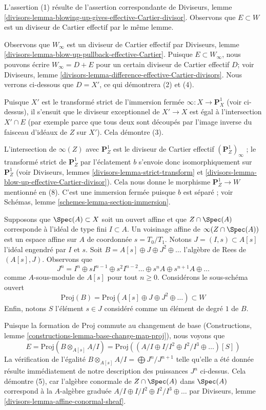 \medskip\noindent
L'assertion (1) résulte de l'assertion correspondante de Diviseurs, lemme
\ref{divisors-lemma-blowing-up-gives-effective-Cartier-divisor}.
Observons que $E \subset W$ est un diviseur de Cartier effectif par le même lemme.

\medskip\noindent
Observons que $W_\infty$ est un diviseur de Cartier effectif par
Diviseurs, lemme \ref{divisors-lemma-blow-up-pullback-effective-Cartier}.
Puisque $E \subset W_\infty$, nous pouvons écrire $W_\infty = D + E$ pour un certain
diviseur de Cartier effectif $D$; voir
Diviseurs, lemme \ref{divisors-lemma-difference-effective-Cartier-divisors}.
Nous verrons ci-dessous que $D = X'$, ce qui démontrera (2) et (4).

\medskip\noindent
Puisque $X'$ est le transformé strict de l'immersion fermée
$\infty : X \to \mathbf{P}^1_X$ (voir ci-dessus), il s'ensuit que le diviseur
exceptionnel de $X' \to X$ est égal à l'intersection $X' \cap E$
(par exemple parce que tous deux sont découpés par l'image inverse du
faisceau d'idéaux de $Z$ sur $X'$). Cela démontre (3).

\medskip\noindent
L'intersection de $\infty(Z)$ avec $\mathbf{P}^1_Z$ est le diviseur de Cartier
effectif $(\mathbf{P}^1_Z)_\infty$ ; le transformé strict
de $\mathbf{P}^1_Z$ par l'éclatement $b$ s'envoie donc isomorphiquement sur
$\mathbf{P}^1_Z$ (voir Diviseurs, lemmes \ref{divisors-lemma-strict-transform}
et \ref{divisors-lemma-blow-up-effective-Cartier-divisor}).
Cela nous donne le morphisme $\mathbf{P}^1_Z \to W$ mentionné en (8).
C'est une immersion fermée puisque $b$ est séparé ; voir
Schémas, lemme \ref{schemes-lemma-section-immersion}.

\medskip\noindent
Supposons que $\Spec(A) \subset X$ soit un ouvert affine et que $Z \cap \Spec(A)$
corresponde à l'idéal de type fini $I \subset A$.
Un voisinage affine de $\infty(Z \cap \Spec(A))$ est un
espace affine sur $A$ de coordonnée $s = T_0/T_1$. Notons
$J = (I, s) \subset A[s]$ l'idéal engendré par $I$ et $s$.
Soit $B = A[s] \oplus J \oplus J^2 \oplus \ldots$ l'algèbre de Rees
de $(A[s], J)$. Observons que
$$
J^n =
I^n \oplus sI^{n - 1} \oplus s^2I^{n - 2} \ldots \oplus s^nA
\oplus s^{n + 1}A \oplus \ldots
$$
comme $A$-sous-module de $A[s]$ pour tout $n \geq 0$. Considérons le sous-schéma ouvert
$$
\text{Proj}(B) = \text{Proj}(A[s] \oplus J \oplus J^2 \oplus \ldots)
\subset W
$$
Enfin, notons $S$ l'élément $s \in J$ considéré comme un élément de degré $1$
de $B$.

\medskip\noindent
Puisque la formation de $\text{Proj}$ commute au changement de base
(Constructions, lemme \ref{constructions-lemma-base-change-map-proj}),
nous voyons que
$$
E = \text{Proj}(B \otimes_{A[s]} A/I) =
\text{Proj}((A/I \oplus I/I^2 \oplus I^2/I^3 \oplus \ldots)[S])
$$
La vérification de l'égalité $B \otimes_{A[s]} A/I = \bigoplus J^n/J^{n + 1}$
telle qu'elle a été donnée
résulte immédiatement de notre description des puissances $J^n$ ci-dessus.
Cela démontre (5), car l'algèbre conormale de $Z \cap \Spec(A)$
dans $\Spec(A)$ correspond à la $A$-algèbre graduée
$A/I \oplus I/I^2 \oplus I^2/I^3 \oplus \ldots$ par
Diviseurs, lemme \ref{divisors-lemma-affine-conormal-sheaf}.

